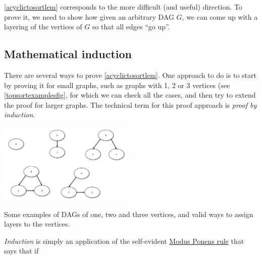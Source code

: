 \cref{acyclictosortlem} corresponds to the more difficult (and useful)
direction. To prove it, we need to show how given an arbitrary DAG
\(G\), we can come up with a layering of the vertices of \(G\) so that
all edges ``go up''.


\subsection{Mathematical induction}\label{inductionsec}

There are several ways to prove \cref{acyclictosortlem}. One approach to
do is to start by proving it for small graphs, such as graphs with 1, 2
or 3 vertices (see \cref{topsortexamplesfig}, for which we can check all
the cases, and then try to extend the proof for larger graphs. The
technical term for this proof approach is \emph{proof by induction}.


\begin{marginfigure}
\centering
\includegraphics[width=\linewidth, height=1.5in, keepaspectratio]{../figure/topologicalsortexamples.png}
\caption{Some examples of DAGs of one, two and three vertices, and valid
ways to assign layers to the vertices.}
\label{topsortexamplesfig}
\end{marginfigure}

\emph{Induction} is simply an application of the self-evident
\href{https://en.wikipedia.org/wiki/Modus_ponens}{Modus Ponens rule}
that says that if

